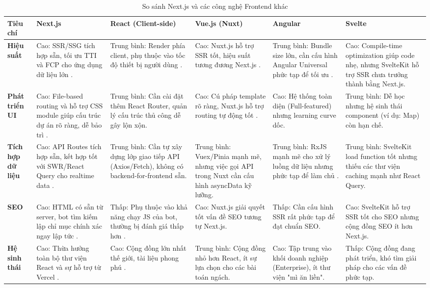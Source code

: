 \clearpage 
\begin{landscape}
\begin{table}[h!]
\centering
\setlength{\tabcolsep}{4pt}
\footnotesize
\renewcommand{\arraystretch}{1.3}
\begin{tabularx}{\linewidth}{|l|X|X|X|X|X|}
\hline
\textbf{Tiêu chí} & \textbf{Next.js} & \textbf{React (Client-side)} & \textbf{Vue.js (Nuxt)} & \textbf{Angular} & \textbf{Svelte} \\
\hline
\textbf{Hiệu suất} & 
Cao: SSR/SSG tích hợp sẵn, tối ưu TTI và FCP cho ứng dụng dữ liệu lớn \cite{shah2023}. & 
Trung bình: Render phía client, phụ thuộc vào tốc độ thiết bị người dùng \cite{shah2023}. & 
Cao: Nuxt.js hỗ trợ SSR tốt, hiệu suất tương đương Next.js \cite{waqar2021}. & 
Trung bình: Bundle size lớn, cần cấu hình Angular Universal phức tạp để tối ưu \cite{waqar2021}. & 
Cao: Compile-time optimization giúp code nhẹ, nhưng SvelteKit hỗ trợ SSR chưa trưởng thành bằng Next.js. \\
\hline
\textbf{Phát triển UI} & 
Cao: File-based routing và hỗ trợ CSS module giúp cấu trúc dự án rõ ràng, dễ bảo trì \cite{fabrizio2022}. & 
Trung bình: Cần cài đặt thêm React Router, quản lý cấu trúc thủ công dễ gây lộn xộn. & 
Cao: Cú pháp template rõ ràng, Nuxt.js hỗ trợ routing tự động tốt \cite{waqar2021}. & 
Cao: Hệ thống toàn diện (Full-featured) nhưng learning curve dốc. & 
Trung bình: Dễ học nhưng hệ sinh thái component (ví dụ: Map) còn hạn chế. \\
\hline
\textbf{Tích hợp dữ liệu} & 
Cao: API Routes tích hợp sẵn, kết hợp tốt với SWR/React Query cho realtime data \cite{thakur2023}. & 
Trung bình: Cần tự xây dựng lớp giao tiếp API (Axios/Fetch), không có backend-for-frontend sẵn. & 
Trung bình: Vuex/Pinia mạnh mẽ, nhưng việc gọi API trong Nuxt cần cấu hình asyncData kỹ lưỡng. & 
Trung bình: RxJS mạnh mẽ cho xử lý luồng dữ liệu nhưng phức tạp để làm chủ \cite{waqar2021}. & 
Trung bình: SvelteKit load function tốt nhưng thiếu các thư viện caching mạnh như React Query. \\
\hline
\textbf{SEO} & 
Cao: HTML có sẵn từ server, bot tìm kiếm lập chỉ mục chính xác ngay lập tức \cite{kshirsagar2022}. & 
Thấp: Phụ thuộc vào khả năng chạy JS của bot, thường bị đánh giá thấp hơn \cite{kshirsagar2022}. & 
Cao: Nuxt.js giải quyết tốt vấn đề SEO tương tự Next.js. & 
Thấp: Cần cấu hình SSR rất phức tạp để đạt chuẩn SEO. & 
Cao: SvelteKit hỗ trợ SSR tốt cho SEO nhưng cộng đồng SEO ít hơn Next.js. \\
\hline
\textbf{Hệ sinh thái} & 
Cao: Thừa hưởng toàn bộ thư viện React và sự hỗ trợ từ Vercel \cite{nextjs_docs}. & 
Cao: Cộng đồng lớn nhất thế giới, tài liệu phong phú \cite{waqar2021}. & 
Trung bình: Cộng đồng nhỏ hơn React, ít sự lựa chọn cho các bài toán ngách. & 
Cao: Tập trung vào khối doanh nghiệp (Enterprise), ít thư viện "mì ăn liền". & 
Thấp: Cộng đồng đang phát triển, khó tìm giải pháp cho các vấn đề phức tạp. \\
\hline
\end{tabularx}
\caption{So sánh Next.js và các công nghệ Frontend khác}
\end{table}
\end{landscape}

